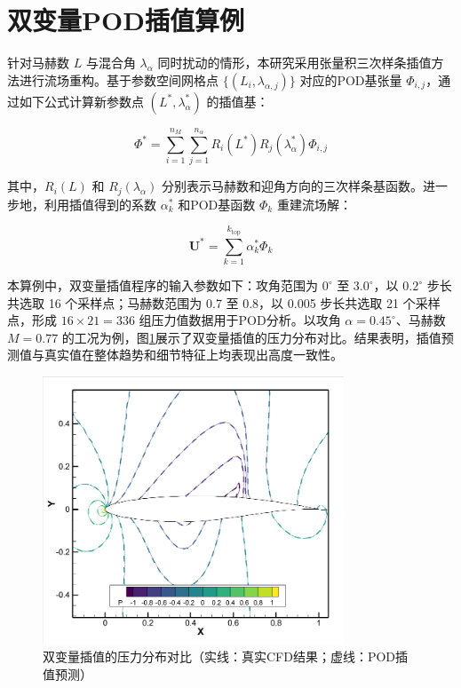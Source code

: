 \section{双变量POD插值算例}
针对马赫数 \( L \) 与混合角 \( \lambda_\alpha \) 同时扰动的情形，本研究采用张量积三次样条插值方法进行流场重构。基于参数空间网格点 \(\{(L_i, \lambda_{\alpha,j})\}\) 对应的POD基张量 \(\Phi_{i,j}\)，通过如下公式计算新参数点 \((L^*, \lambda_\alpha^*)\) 的插值基：

\begin{equation}
    \Phi^* = \sum_{i=1}^{n_M} \sum_{j=1}^{n_\alpha} R_i(L^*) R_j(\lambda_\alpha^*) \Phi_{i,j}
    \label{eq:double_spline}
\end{equation}

其中，\( R_i(L) \) 和 \( R_j(\lambda_\alpha) \) 分别表示马赫数和迎角方向的三次样条基函数。进一步地，利用插值得到的系数 \(\alpha_k^*\) 和POD基函数 \(\Phi_k\) 重建流场解：

\begin{equation}
    \mathbf{U}^* = \sum_{k=1}^{k_{\text{top}}} \alpha_k^* \Phi_k
    \label{eq:double_solution}
\end{equation}

本算例中，双变量插值程序的输入参数如下：攻角范围为 \(0^\circ\) 至 \(3.0^\circ\)，以 \(0.2^\circ\) 步长共选取 16 个采样点；马赫数范围为 0.7 至 0.8，以 0.005 步长共选取 21 个采样点，形成 \(16 \times 21 = 336\) 组压力值数据用于POD分析。以攻角 \( \alpha = 0.45^\circ \)、马赫数 \( M = 0.77 \) 的工况为例，图\ref{fig:double_interp}展示了双变量插值的压力分布对比。结果表明，插值预测值与真实值在整体趋势和细节特征上均表现出高度一致性。

\begin{figure}[H]
    \centering
    \includegraphics[width=0.8\textwidth]{0.45_0.77对比图.png}
    \caption{双变量插值的压力分布对比（实线：真实CFD结果；虚线：POD插值预测）}
    \label{fig:double_interp}
\end{figure}

